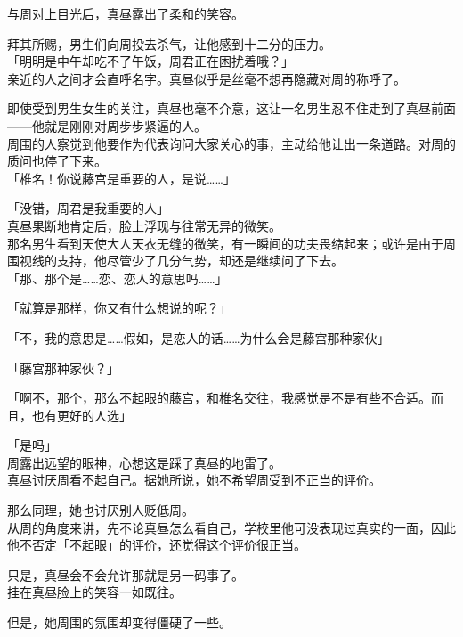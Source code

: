 与周对上目光后，真昼露出了柔和的笑容。

拜其所赐，男生们向周投去杀气，让他感到十二分的压力。\\

「明明是中午却吃不了午饭，周君正在困扰着哦？」\\

亲近的人之间才会直呼名字。真昼似乎是丝毫不想再隐藏对周的称呼了。

即使受到男生女生的关注，真昼也毫不介意，这让一名男生忍不住走到了真昼前面——他就是刚刚对周步步紧逼的人。\\

周围的人察觉到他要作为代表询问大家关心的事，主动给他让出一条道路。对周的质问也停了下来。\\

「椎名！你说藤宫是重要的人，是说……」

「没错，周君是我重要的人」\\

真昼果断地肯定后，脸上浮现与往常无异的微笑。\\

那名男生看到天使大人天衣无缝的微笑，有一瞬间的功夫畏缩起来；或许是由于周围视线的支持，他尽管少了几分气势，却还是继续问了下去。\\

「那、那个是……恋、恋人的意思吗……」

「就算是那样，你又有什么想说的呢？」

「不，我的意思是……假如，是恋人的话……为什么会是藤宫那种家伙」

「藤宫那种家伙？」

「啊不，那个，那么不起眼的藤宫，和椎名交往，我感觉是不是有些不合适。而且，也有更好的人选」

「是吗」\\

周露出远望的眼神，心想这是踩了真昼的地雷了。\\

真昼讨厌周看不起自己。据她所说，她不希望周受到不正当的评价。

那么同理，她也讨厌别人贬低周。\\

从周的角度来讲，先不论真昼怎么看自己，学校里他可没表现过真实的一面，因此他不否定「不起眼」的评价，还觉得这个评价很正当。

只是，真昼会不会允许那就是另一码事了。\\

挂在真昼脸上的笑容一如既往。

但是，她周围的氛围却变得僵硬了一些。\\

